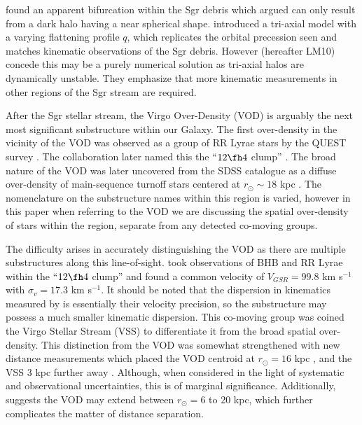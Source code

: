 \documentclass[preprint2]{aastex}
\begin{document}
\citet{Belokurov;et-al_2006} found an apparent bifurcation within the Sgr debris which \citet{Fellhauer;et-al_2006} argued can only result from a dark halo having a near spherical shape. \citet{Law;et-al_2009} introduced a tri-axial model with a varying flattening profile $q$, which replicates the orbital precession seen and matches kinematic observations of the Sgr debris. However \citet{Law;Majewski_2010} (hereafter LM10) concede this may be a purely numerical solution as tri-axial halos are dynamically unstable. They emphasize that  more kinematic measurements in other regions of the Sgr stream are required.

After the Sgr stellar stream, the Virgo Over-Density (VOD) is arguably the next most significant substructure within our Galaxy. The first over-density in the vicinity of the VOD was observed as a group of RR Lyrae stars by the QUEST survey \citep{Vivas;et-al_2001}. The collaboration later named this the ``$12\fh4$ clump'' \citep{Zinn;et-al_2004}. The broad nature of the VOD was later uncovered from the SDSS catalogue as a diffuse over-density of main-sequence turnoff stars centered at $r_\odot \sim18$ kpc \citep[which ][dubbed as S297+63-20.5]{Newberg;et-al_2002}. The nomenclature on the substructure names within this region is varied, however in this paper when referring to the VOD we are discussing the spatial over-density of stars within the region, separate from any detected co-moving groups.
	
The difficulty arises in accurately distinguishing the VOD as there are multiple substructures along this line-of-sight. \citet{Duffau;et-al_2006} took observations of BHB and RR Lyrae within the ``$12\fh4$ clump'' and found a common velocity of $V_{GSR} = 99.8$ km s$^{-1}$ with $\sigma_{v} = 17.3$ km s$^{-1}$. It should be noted that the dispersion in kinematics measured by \citet{Duffau;et-al_2006} is essentially their velocity precision, so the substructure may possess a much smaller kinematic dispersion. This co-moving group was coined the Virgo Stellar Stream (VSS) to differentiate it from the broad spatial over-density. This distinction from the VOD was somewhat strengthened with new distance measurements which placed the VOD centroid at $r_\odot = 16$ kpc \citep{Juric;et-al_2008, Keller_2010}, and the VSS 3 kpc further away \citep{Duffau;et-al_2006}. Although, when considered in the light of systematic and observational uncertainties, this is of marginal significance. Additionally, \citet{Juric;et-al_2008} suggests the VOD may extend between $r_\odot = 6$ to 20 kpc, which further complicates the matter of distance separation.
 
\end{document}
